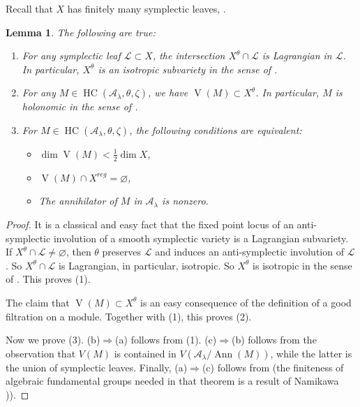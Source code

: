 \documentclass[12pt]{amsart}
\newcommand{\A}{\mathcal{A}}
\newcommand{\HC}{\operatorname{HC}}
\newtheorem{Lem}[Thm]{Lemma}
\theoremstyle{definition}
\numberwithin{equation}{section}
\begin{document}
Recall that $X$ has finitely many symplectic leaves, \cite{Kaledin_symplectic}.

\begin{Lem}\label{Lem:lag_antiinvolution}
The following are true:
\begin{enumerate}
\item For any symplectic leaf $\mathcal{L}\subset X$, the intersection $X^\theta\cap \mathcal{L}$
is Lagrangian in $\mathcal{L}$. In particular, $X^\theta$ is an isotropic subvariety in the sense of
\cite{B_ineq}.
\item For any $M\in \HC(\A_\lambda,\theta,\zeta)$, we have $\operatorname{V}(M)\subset X^\theta$. In particular,  $M$ is holonomic in the sense of \cite{B_ineq}.
\item For $M\in \HC(\A_\lambda,\theta,\zeta)$, the following conditions are equivalent:
\begin{itemize}
\item[(a)] $\dim \operatorname{V}(M)<\frac{1}{2}\dim X$,
\item[(b)] $\operatorname{V}(M)\cap X^{reg}=\varnothing$,
\item[(c)] The annihilator of $M$ in $\A_\lambda$ is nonzero.
\end{itemize}
\end{enumerate}
\end{Lem}
\begin{proof}
It is a classical and easy fact that the fixed point locus of an anti-symplectic involution of a
smooth symplectic variety is a Lagrangian subvariety. If $X^\theta\cap \mathcal{L}\neq \varnothing$,
then $\theta$ preserves $\mathcal{L}$ and induces an anti-symplectic involution of $\mathcal{L}$.
So $X^\theta\cap \mathcal{L}$ is Lagrangian, in particular, isotropic. So $X^\theta$ is isotropic
in the sense of \cite{B_ineq}. This proves (1).

The claim that $\operatorname{V}(M)\subset X^\theta$ is an easy consequence of the definition of
a good filtration on a module. Together with (1), this proves (2).

Now we prove (3). (b)$\Rightarrow$(a) follows from (1). (c)$\Rightarrow$(b) follows from
the observation that $V(M)$ is contained in $V(\A_\lambda/\operatorname{Ann}(M))$, while
the latter is the union of symplectic leaves. Finally, (a)$\Rightarrow$(c) follows
from \cite[Theorem 1.2]{B_ineq} (the finiteness of algebraic fundamental groups needed in that
theorem is a result of Namikawa \cite{Namikawa})).
\end{proof}
\end{document}

